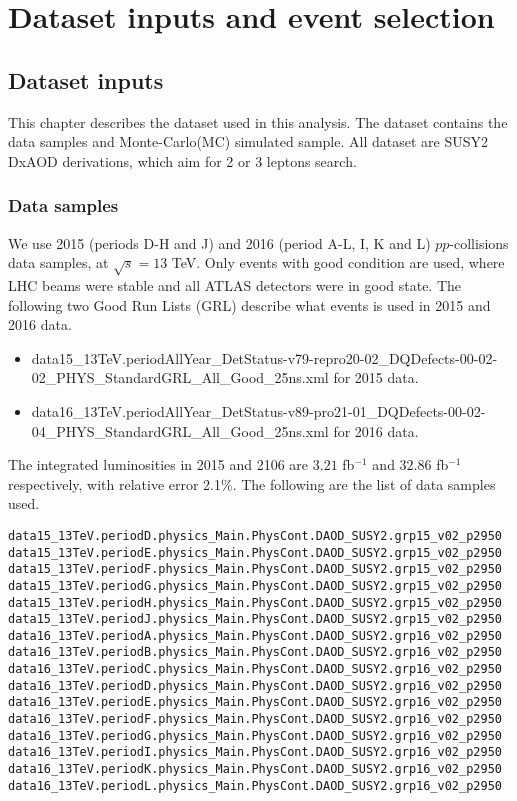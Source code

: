 \chapter{Dataset inputs and event selection}
\label{ch:event}

\section{Dataset inputs}
This chapter describes the dataset used in this analysis.
The dataset contains the data samples and Monte-Carlo(MC) simulated sample.
All dataset are SUSY2 DxAOD derivations, which aim for 2 or 3 leptons search.

\subsection{Data samples}
We use 2015 (periods D-H and J) and 2016 (period A-L, I, K and L) $pp$-collisions data samples, at $\sqrt s=13$ TeV.
Only events with good condition are used, where LHC beams were stable and all ATLAS detectors were in good state.
The following two Good Run Lists (GRL) describe what events is used in 2015 and 2016 data.
\begin{itemize}
\item {\ttfamily\scriptsize data15\_13TeV.periodAllYear\_DetStatus-v79-repro20-02\_DQDefects-00-02-02\_PHYS\_StandardGRL\_All\_Good\_25ns.xml} for 2015 data.
\item {\ttfamily\scriptsize data16\_13TeV.periodAllYear\_DetStatus-v89-pro21-01\_DQDefects-00-02-04\_PHYS\_StandardGRL\_All\_Good\_25ns.xml} for 2016 data.
\end{itemize}
The integrated luminosities in 2015 and 2106 are $3.21$ fb$^{-1}$ and $32.86$ fb$^{-1}$ respectively, with relative error 2.1\%.
The following are the list of data samples used.
\scriptsize
\begin{verbatim}
data15_13TeV.periodD.physics_Main.PhysCont.DAOD_SUSY2.grp15_v02_p2950
data15_13TeV.periodE.physics_Main.PhysCont.DAOD_SUSY2.grp15_v02_p2950
data15_13TeV.periodF.physics_Main.PhysCont.DAOD_SUSY2.grp15_v02_p2950
data15_13TeV.periodG.physics_Main.PhysCont.DAOD_SUSY2.grp15_v02_p2950
data15_13TeV.periodH.physics_Main.PhysCont.DAOD_SUSY2.grp15_v02_p2950
data15_13TeV.periodJ.physics_Main.PhysCont.DAOD_SUSY2.grp15_v02_p2950
data16_13TeV.periodA.physics_Main.PhysCont.DAOD_SUSY2.grp16_v02_p2950
data16_13TeV.periodB.physics_Main.PhysCont.DAOD_SUSY2.grp16_v02_p2950
data16_13TeV.periodC.physics_Main.PhysCont.DAOD_SUSY2.grp16_v02_p2950
data16_13TeV.periodD.physics_Main.PhysCont.DAOD_SUSY2.grp16_v02_p2950
data16_13TeV.periodE.physics_Main.PhysCont.DAOD_SUSY2.grp16_v02_p2950
data16_13TeV.periodF.physics_Main.PhysCont.DAOD_SUSY2.grp16_v02_p2950
data16_13TeV.periodG.physics_Main.PhysCont.DAOD_SUSY2.grp16_v02_p2950
data16_13TeV.periodI.physics_Main.PhysCont.DAOD_SUSY2.grp16_v02_p2950
data16_13TeV.periodK.physics_Main.PhysCont.DAOD_SUSY2.grp16_v02_p2950
data16_13TeV.periodL.physics_Main.PhysCont.DAOD_SUSY2.grp16_v02_p2950
\end{verbatim}
\normalsize

